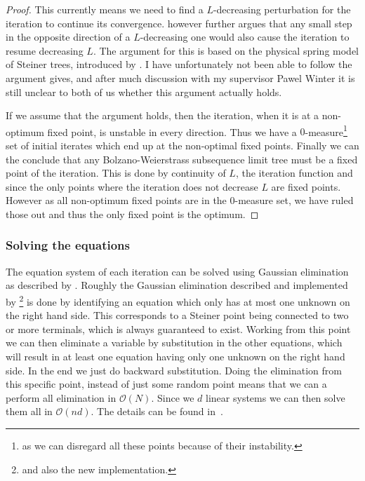\begin{proof}
This currently means we need to find a $L$-decreasing perturbation for
the iteration to continue its convergence. \citeauthor{smith1992} however
further argues that any small step in the opposite direction of a $L$-decreasing
one would also cause the iteration to resume decreasing $L$. The argument for
this is based on the physical spring model of Steiner trees, introduced by
\textcite{gilbert1968}. I have unfortunately not been able to follow the
argument \textcite{smith1992} gives, and after much discussion with my
supervisor Pawel Winter it is still unclear to both of us whether this argument
actually holds.

If we assume that the argument holds, then the iteration, when it is at a
non-optimum fixed point, is unstable in every direction. Thus we have a
$0$-measure\footnote{as we can disregard all these points because of their
  instability.} set of initial iterates which end up at the non-optimal fixed
points. Finally we can the conclude that any Bolzano-Weierstrass subsequence
limit tree must be a fixed point of the iteration. This is done by continuity of
$L$, the iteration function and since the only points where the iteration does
not decrease $L$ are fixed points. However as all non-optimum fixed points are
in the 0-measure set, we have ruled those out and thus the only fixed point is
the optimum.
\end{proof}


\subsubsection{Solving the equations}
\label{sec:solving-equations}

The equation system of each iteration can be solved using Gaussian elimination
as described by \textcite[p.~148--149]{smith1992}. Roughly the Gaussian
elimination described and implemented by \citeauthor{smith1992}\footnote{and
  also the new implementation.} is done by identifying an equation which only
has at most one unknown on the right hand side. This corresponds to a Steiner
point being connected to two or more terminals, which is always guaranteed to
exist. Working from this point we can then eliminate a variable by substitution
in the other equations, which will result in at least one equation having only
one unknown on the right hand side. In the end we just do backward substitution.
Doing the elimination from this specific point, instead of just some random
point means that we can a perform all elimination in $\mathcal O(N)$. Since we
$d$ linear systems we can then solve them all in $\mathcal{O}(n d)$. The details
can be found in~\cite[p.~148--149]{smith1992}.

